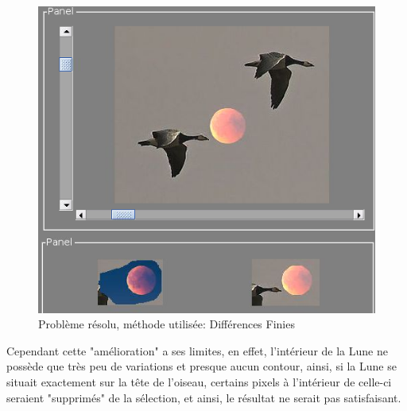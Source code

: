 \begin{figure}[!h]
\centering
\includegraphics[scale=0.25]{Images/sol.png}
\caption{Problème résolu, méthode utilisée: Différences Finies}
\end{figure}
\newpage
Cependant cette "amélioration" a ses limites, en effet, l'intérieur de la Lune ne possède que très peu de variations et presque aucun contour, ainsi, si la Lune se situait exactement sur la tête de l'oiseau, certains pixels à l'intérieur de celle-ci seraient "supprimés" de la sélection, et ainsi, le résultat ne serait pas satisfaisant.
